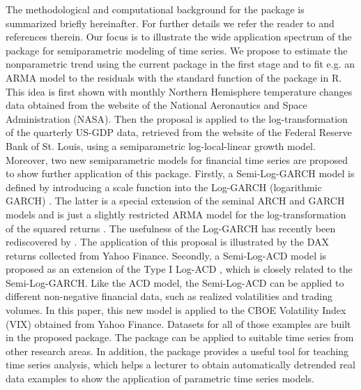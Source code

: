 The methodological and computational background for the  package is summarized briefly hereinafter. For further details we refer the reader to \citet{fenggriesfritz2020} and references therein. Our focus is to illustrate the wide application spectrum of the  package for semiparametric modeling of time series. We propose to estimate the nonparametric trend using the current package in the first stage and to fit e.g. an ARMA model to the residuals with the standard  function of the  package in R. This idea is first shown with monthly Northern Hemisphere temperature changes data obtained from the website of the National Aeronautics and Space Administration (NASA). Then the proposal is applied to the log-transformation of the quarterly US-GDP data, retrieved from the website of the Federal Reserve Bank of St. Louis, using a semiparametric log-local-linear growth model. 
Moreover, two new semiparametric models for financial time series are proposed to show further application of this package. 
Firstly, a Semi-Log-GARCH model is defined by introducing a scale function into the Log-GARCH (logarithmic GARCH) \citep{pantula1986, geweke1986, milhoj1987multi}. The latter is a special extension of the seminal ARCH \citep[autoregressive conditional heteroskedasticity,][]{engle1982arch} and GARCH \citep[generalized ARCH,][]{bollerslev1986garch} models and is just a slightly restricted ARMA model for the log-transformation of the squared returns \citep[see e.g.][]{sucarrat2019log}. The usefulness of the Log-GARCH has recently been rediscovered by \citet{francq2013garch}. The application of this proposal is illustrated by the DAX returns collected from Yahoo Finance. 
Secondly, a Semi-Log-ACD model is proposed as an extension of the Type I Log-ACD \citep{bauwens2000lacd}, which is closely related to the Semi-Log-GARCH. Like the ACD \citep[autoregressive conditional duration,][]{engle1998acd} model, the Semi-Log-ACD can be applied to different non-negative financial data, such as realized volatilities and trading volumes. In this paper, this new model is applied to the CBOE Volatility Index (VIX) obtained from Yahoo Finance. Datasets for all of those examples are built in the proposed package. The  package can be applied to suitable time series from other research areas. In addition, the  package provides a useful tool for teaching time series analysis, which helps a lecturer to obtain automatically detrended real data examples to show the application of parametric time series models.    

